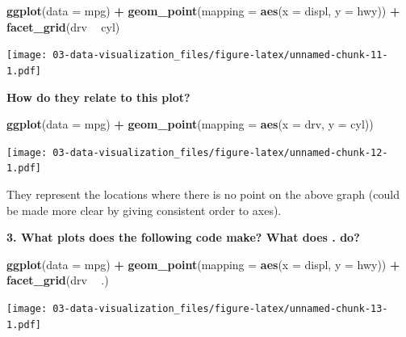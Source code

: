 \documentclass[]{book}
\newenvironment{Shaded}{\begin{snugshade}}{\end{snugshade}}
\newcommand{\DataTypeTok}[1]{\textcolor[rgb]{0.13,0.29,0.53}{#1}}
\newcommand{\KeywordTok}[1]{\textcolor[rgb]{0.13,0.29,0.53}{\textbf{#1}}}
\newcommand{\NormalTok}[1]{#1}
\newcommand{\OperatorTok}[1]{\textcolor[rgb]{0.81,0.36,0.00}{\textbf{#1}}}
\newcommand{\StringTok}[1]{\textcolor[rgb]{0.31,0.60,0.02}{#1}}
\theoremstyle{definition}
\theoremstyle{definition}
\theoremstyle{definition}
\theoremstyle{remark}
\begin{document}
\begin{Shaded}
\begin{Highlighting}[]
\KeywordTok{ggplot}\NormalTok{(}\DataTypeTok{data =}\NormalTok{ mpg) }\OperatorTok{+}\StringTok{ }
\StringTok{  }\KeywordTok{geom_point}\NormalTok{(}\DataTypeTok{mapping =} \KeywordTok{aes}\NormalTok{(}\DataTypeTok{x =}\NormalTok{ displ, }\DataTypeTok{y =}\NormalTok{ hwy)) }\OperatorTok{+}\StringTok{ }
\StringTok{  }\KeywordTok{facet_grid}\NormalTok{(drv }\OperatorTok{~}\StringTok{ }\NormalTok{cyl)}
\end{Highlighting}
\end{Shaded}

\texttt{[image: 03-data-visualization\_files/figure-latex/unnamed-chunk-11-1.pdf]}

\textbf{How do they relate to this plot?}

\begin{Shaded}
\begin{Highlighting}[]
\KeywordTok{ggplot}\NormalTok{(}\DataTypeTok{data =}\NormalTok{ mpg) }\OperatorTok{+}\StringTok{ }
\StringTok{  }\KeywordTok{geom_point}\NormalTok{(}\DataTypeTok{mapping =} \KeywordTok{aes}\NormalTok{(}\DataTypeTok{x =}\NormalTok{ drv, }\DataTypeTok{y =}\NormalTok{ cyl))}
\end{Highlighting}
\end{Shaded}

\texttt{[image: 03-data-visualization\_files/figure-latex/unnamed-chunk-12-1.pdf]}

They represent the locations where there is no point on the above graph
(could be made more clear by giving consistent order to axes).

\textbf{3. What plots does the following code make? What does . do?}

\begin{Shaded}
\begin{Highlighting}[]
\KeywordTok{ggplot}\NormalTok{(}\DataTypeTok{data =}\NormalTok{ mpg) }\OperatorTok{+}\StringTok{ }
\StringTok{  }\KeywordTok{geom_point}\NormalTok{(}\DataTypeTok{mapping =} \KeywordTok{aes}\NormalTok{(}\DataTypeTok{x =}\NormalTok{ displ, }\DataTypeTok{y =}\NormalTok{ hwy)) }\OperatorTok{+}
\StringTok{  }\KeywordTok{facet_grid}\NormalTok{(drv }\OperatorTok{~}\StringTok{ }\NormalTok{.)}
\end{Highlighting}
\end{Shaded}

\texttt{[image: 03-data-visualization\_files/figure-latex/unnamed-chunk-13-1.pdf]}
\end{document}
